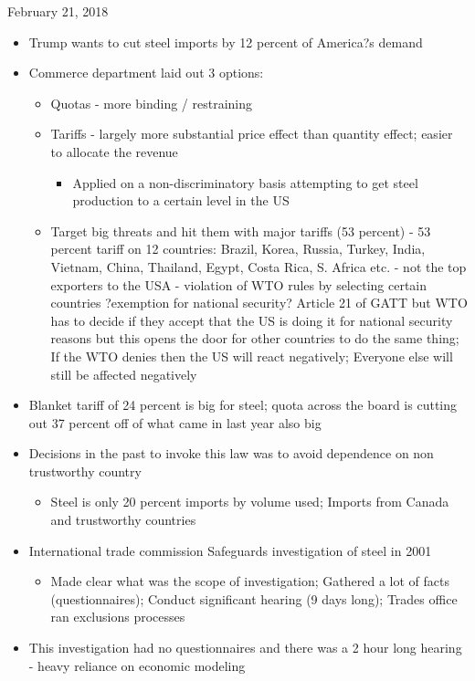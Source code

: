 \documentclass[10pt]{article}
\begin{document}
\normalsize February 21, 2018
\begin{itemize}
  \item Trump wants to cut steel imports by 12 percent of America?s demand 
  \item Commerce department laid out 3 options:
\begin{itemize}
\item Quotas - more binding / restraining
\item Tariffs - largely more substantial price effect than quantity effect; easier to allocate the revenue 
\begin{itemize}
  \item Applied on a non-discriminatory basis attempting to get steel production to a certain level in the US
\end{itemize}
\item Target big threats and hit them with major tariffs (53 percent) - 53 percent tariff on 12 countries: Brazil, Korea, Russia, Turkey, India, Vietnam, China, Thailand, Egypt, Costa Rica, S. Africa etc. - not the top exporters to the USA - violation of WTO rules by selecting certain countries ?exemption for national security? Article 21 of GATT but WTO has to decide if they accept that the US is doing it for national security reasons but this opens the door for other countries to do the same thing; If the WTO denies then the US will react negatively; Everyone else will still be affected negatively  
\end{itemize}  
  \item Blanket tariff of 24 percent is big for steel; quota across the board is cutting out 37 percent off of what came in last year also big
  \item Decisions in the past to invoke this law was to avoid dependence on non trustworthy country
  \begin{itemize}
    \item Steel is only 20 percent imports by volume used; Imports from Canada and trustworthy countries
  \end{itemize}
  \item International trade commission Safeguards investigation of steel in 2001 
\begin{itemize}
  \item Made clear what was the scope of investigation; Gathered a lot of facts (questionnaires); Conduct significant hearing (9 days long); Trades office ran exclusions processes
\end{itemize}
  \item This investigation had no questionnaires and there was a 2 hour long hearing - heavy reliance on economic modeling

\end{itemize}
\end{document}

